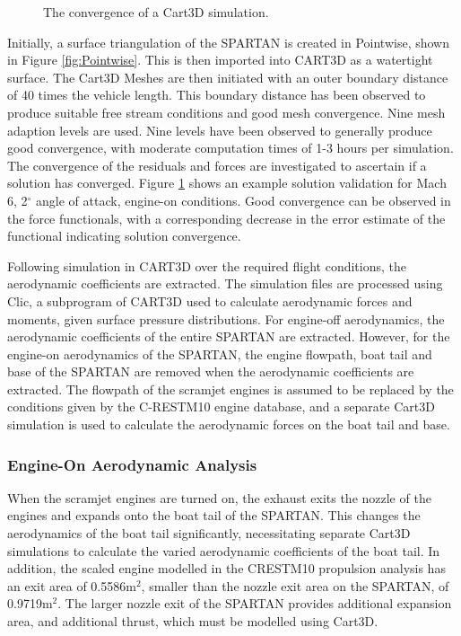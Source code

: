 \begin{figure}[ht]
\begin{subfigure}{.5\textwidth}
	\end{subfigure}
	
	\caption{The convergence of a Cart3D simulation.}
	\label{fig:Cart3dValidation}
\end{figure}

Initially, a surface triangulation of the SPARTAN is created in Pointwise, shown in Figure \ref{fig:Pointwise}. This is then imported into CART3D as a watertight surface. 
The Cart3D Meshes are then initiated with an outer boundary distance of 40 times the vehicle length. This boundary distance has been observed to produce suitable free stream conditions and good mesh convergence. Nine mesh adaption levels are used. Nine levels have been observed to generally produce good convergence, with moderate computation times of 1-3 hours per simulation. The convergence of the residuals and forces are investigated to ascertain if a solution has converged. Figure \ref{fig:Cart3dValidation} shows an example solution validation for Mach 6, 2$^\circ$ angle of attack, engine-on conditions. Good convergence can be observed in the force functionals, with a corresponding decrease in the error estimate of the functional indicating solution convergence.  

Following simulation in CART3D over the required flight conditions, the aerodynamic coefficients are extracted. The simulation files are processed using Clic, a subprogram of CART3D used to calculate aerodynamic forces and moments, given surface pressure distributions. 
For engine-off aerodynamics, the aerodynamic coefficients of the entire SPARTAN are extracted. However, for the engine-on aerodynamics of the SPARTAN, the engine flowpath, boat tail and base of the SPARTAN are removed when the aerodynamic coefficients are extracted. The flowpath of the scramjet engines is assumed to be replaced by the conditions given by the C-RESTM10 engine database, and a separate Cart3D simulation is used to calculate the aerodynamic forces on the boat tail and base. 



\subsubsection{Engine-On Aerodynamic Analysis}\label{sec:engine-oncart}

When the scramjet engines are turned on, the exhaust exits the nozzle of the engines and expands onto the boat tail of the SPARTAN. This changes the aerodynamics of the boat tail significantly, necessitating separate Cart3D simulations to calculate the varied aerodynamic coefficients of the boat tail. In addition, 
the scaled engine modelled in the CRESTM10 propulsion analysis has an exit area of 0.5586m$^2$, smaller than the nozzle exit area on the SPARTAN, of 0.9719m$^2$. The larger nozzle exit of the SPARTAN provides additional expansion area, and additional thrust, which must be modelled using Cart3D. 

